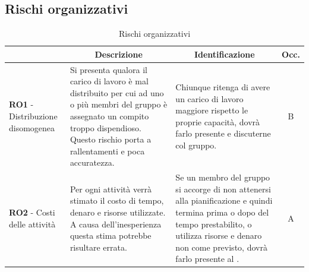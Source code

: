 \subsection{Rischi organizzativi} \label{subsection:rischi_organizzazione}
\begin{table}[H]
  \centering
  \renewcommand{\arraystretch}{1.8}
  \begin{tabular}{p{5.5cm}|p{5cm}|p{5cm}|c}
    \rowcolor[HTML]{125E28} 
    \multicolumn{1}{c}{\color[HTML]{FFFFFF}\textbf{Codice}}
    & \multicolumn{1}{c}{\color[HTML]{FFFFFF}\textbf{Descrizione}}
    & \multicolumn{1}{c}{\color[HTML]{FFFFFF}\textbf{Identificazione}}
    & \color[HTML]{FFFFFF}\textbf{Occ.}\\
    \hline
    \textbf{RO1} - Distribuzione disomogenea & Si presenta qualora il carico di lavoro è mal distribuito per cui ad uno o più membri del gruppo è assegnato un compito troppo dispendioso. Questo rischio porta a rallentamenti e poca accuratezza. & Chiunque ritenga di avere un carico di lavoro maggiore rispetto le proprie capacità, dovrà farlo presente e discuterne col gruppo. & B \\
    \textbf{RO2} - Costi delle attività & Per ogni attività verrà stimato il costo di tempo, denaro e risorse utilizzate. A causa dell'inesperienza questa stima potrebbe risultare errata. & Se un membro del gruppo si accorge di non attenersi alla pianificazione e quindi termina prima o dopo del tempo prestabilito, o utilizza risorse e denaro non come previsto, dovrà farlo presente al \roleProjectManager{}. & A \\
  \end{tabular}
  \caption{Rischi organizzativi}
\end{table}


